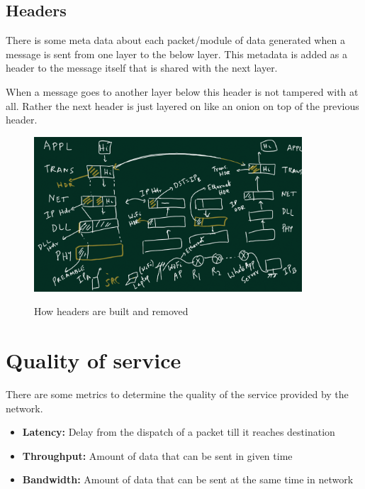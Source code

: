 \documentclass[12pt]{article}
\newcommand{\tbox}[1]{\noindent\fbox{\parbox{\textwidth}{#1}}}
\begin{document}
\noindent\tbox{
    \begin{center}
    \textbf{\Huge Lecture 4}
    \end{center}
}

\subsection{Headers}

There is some meta data about each packet/module of data generated when a message is sent from one layer to the below layer. 
This metadata is added as a header to the message itself that is shared with the next layer. 

When a message goes to another layer below this header is not tampered with at all. Rather the next header is 
just layered on like an onion on top of the previous header. 


\begin{figure}[H]
    \centering 
    \includegraphics*[width = 10cm]{Diagrams/headers.png}
    \label{fig:headers}
    \caption{How headers are built and removed}
\end{figure}


\section{Quality of service}

There are some metrics to determine the quality of the service provided by the network. 

\begin{itemize}
    \item \textbf{Latency:} Delay from the dispatch of a packet till it reaches destination
    \item \textbf{Throughput:} Amount of data that can be sent in given time
    \item \textbf{Bandwidth:} Amount of data that can be sent at the same time in network
\end{itemize}
\end{document}
